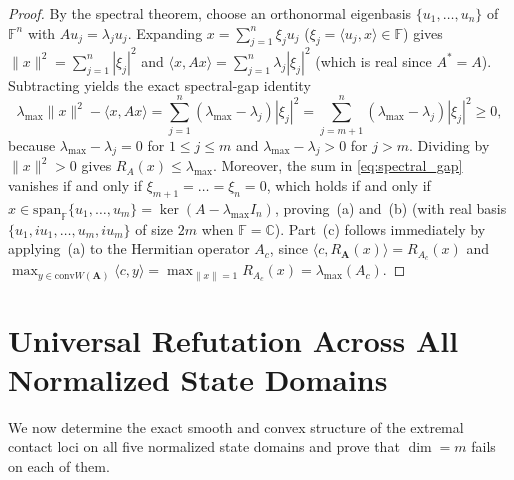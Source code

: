\documentclass[11pt,a4paper]{article}
\theoremstyle{definition}
\theoremstyle{remark}
\newcommand{\CC}{\mathbb{C}}
\newcommand{\FF}{\mathbb{F}}
\newcommand{\conv}{\mathrm{conv}}
\begin{document}
\begin{proof}
By the spectral theorem, choose an orthonormal eigenbasis $\{u_1, \dots, u_n\}$ of $\FF^n$ with $A u_j = \lambda_j u_j$. Expanding $x = \sum_{j=1}^n \xi_j u_j$ ($\xi_j = \langle u_j, x \rangle \in \FF$) gives $\|x\|^2 = \sum_{j=1}^n |\xi_j|^2$ and $\langle x, A x \rangle = \sum_{j=1}^n \lambda_j |\xi_j|^2$ (which is real since $A^* = A$). Subtracting yields the exact spectral-gap identity
\begin{equation}
\label{eq:spectral_gap}
  \lambda_{\max} \|x\|^2 - \langle x, A x \rangle = \sum_{j=1}^n (\lambda_{\max} - \lambda_j) |\xi_j|^2 = \sum_{j=m+1}^n (\lambda_{\max} - \lambda_j) |\xi_j|^2 \ge 0,
\end{equation}
because $\lambda_{\max} - \lambda_j = 0$ for $1 \le j \le m$ and $\lambda_{\max} - \lambda_j > 0$ for $j > m$. Dividing by $\|x\|^2 > 0$ gives $R_A(x) \le \lambda_{\max}$. Moreover, the sum in \eqref{eq:spectral_gap} vanishes if and only if $\xi_{m+1} = \dots = \xi_n = 0$, which holds if and only if $x \in \mathrm{span}_{\FF}\{u_1, \dots, u_m\} = \ker(A - \lambda_{\max} I_n)$, proving~(a) and~(b) (with real basis $\{u_1, i u_1, \dots, u_m, i u_m\}$ of size $2m$ when $\FF = \CC$). Part~(c) follows immediately by applying~(a) to the Hermitian operator $A_c$, since $\langle c, R_{\mathbf{A}}(x) \rangle = R_{A_c}(x)$ and $\max_{y \in \conv W(\mathbf{A})} \langle c, y \rangle = \max_{\|x\|=1} R_{A_c}(x) = \lambda_{\max}(A_c)$.
\end{proof}

\section{Universal Refutation Across All Normalized State Domains}
\label{sec:refutation}

We now determine the exact smooth and convex structure of the extremal contact loci on all five normalized state domains and prove that $\dim = m$ fails on each of them.
\end{document}
